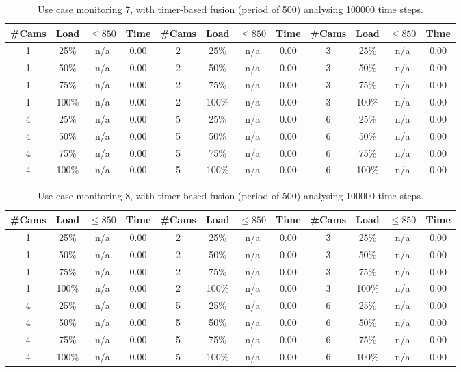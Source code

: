 \documentclass{article}
\begin{document}
\begin{table}
\centering
\begin{tabular}{|c|c|c|c|c|c|c|c|c|c|c|c|}
\hline
\#Cams & Load & $\leq 850$ & Time & \#Cams & Load & $\leq 850$ & Time & \#Cams & Load & $\leq 850$ & Time\\
\hline
1 & 25\% & n/a & 0.00 & 2 & 25\% & n/a & 0.00 & 3 & 25\% & n/a & 0.00\\
1 & 50\% & n/a & 0.00 & 2 & 50\% & n/a & 0.00 & 3 & 50\% & n/a & 0.00\\
1 & 75\% & n/a & 0.00 & 2 & 75\% & n/a & 0.00 & 3 & 75\% & n/a & 0.00\\
1 & 100\% & n/a & 0.00 & 2 & 100\% & n/a & 0.00 & 3 & 100\% & n/a & 0.00\\
\hline
4 & 25\% & n/a & 0.00 & 5 & 25\% & n/a & 0.00 & 6 & 25\% & n/a & 0.00\\
4 & 50\% & n/a & 0.00 & 5 & 50\% & n/a & 0.00 & 6 & 50\% & n/a & 0.00\\
4 & 75\% & n/a & 0.00 & 5 & 75\% & n/a & 0.00 & 6 & 75\% & n/a & 0.00\\
4 & 100\% & n/a & 0.00 & 5 & 100\% & n/a & 0.00 & 6 & 100\% & n/a & 0.00\\
\hline
\end{tabular}
\caption{Use case monitoring 7, with timer-based fusion (period of 500) analysing 100000 time steps.}
\end{table}


\begin{table}
\centering
\begin{tabular}{|c|c|c|c|c|c|c|c|c|c|c|c|}
\hline
\#Cams & Load & $\leq 850$ & Time & \#Cams & Load & $\leq 850$ & Time & \#Cams & Load & $\leq 850$ & Time\\
\hline
1 & 25\% & n/a & 0.00 & 2 & 25\% & n/a & 0.00 & 3 & 25\% & n/a & 0.00\\
1 & 50\% & n/a & 0.00 & 2 & 50\% & n/a & 0.00 & 3 & 50\% & n/a & 0.00\\
1 & 75\% & n/a & 0.00 & 2 & 75\% & n/a & 0.00 & 3 & 75\% & n/a & 0.00\\
1 & 100\% & n/a & 0.00 & 2 & 100\% & n/a & 0.00 & 3 & 100\% & n/a & 0.00\\
\hline
4 & 25\% & n/a & 0.00 & 5 & 25\% & n/a & 0.00 & 6 & 25\% & n/a & 0.00\\
4 & 50\% & n/a & 0.00 & 5 & 50\% & n/a & 0.00 & 6 & 50\% & n/a & 0.00\\
4 & 75\% & n/a & 0.00 & 5 & 75\% & n/a & 0.00 & 6 & 75\% & n/a & 0.00\\
4 & 100\% & n/a & 0.00 & 5 & 100\% & n/a & 0.00 & 6 & 100\% & n/a & 0.00\\
\hline
\end{tabular}
\caption{Use case monitoring 8, with timer-based fusion (period of 500) analysing 100000 time steps.}
\end{table}
\end{document}
